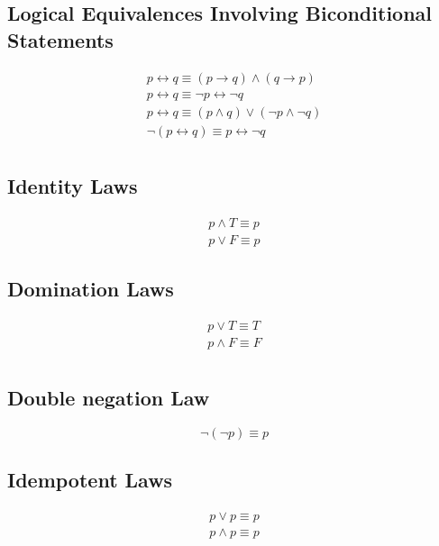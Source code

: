 \documentclass[12pt letter]{report}
\begin{document}
\subsection{Logical Equivalences Involving Biconditional Statements}

\begin{align*}
	p \leftrightarrow q \equiv \left( p\to q \right) \wedge \left( q \to   p \right)              \\
	p \leftrightarrow q \equiv \neg p \leftrightarrow \neg q                                      \\
	p \leftrightarrow q \equiv \left( p \wedge q \right) \vee \left( \neg p \wedge \neg q \right) \\
	\neg \left( p \leftrightarrow q \right) \equiv p \leftrightarrow \neg q                       \\
\end{align*}

\subsection{Identity Laws}

\begin{align*}
	p \wedge T \equiv p \\
	p \vee F  \equiv p
\end{align*}

\subsection{Domination Laws}

\begin{align*}
	p \vee T \equiv T    \\
	p \wedge  F \equiv F \\
\end{align*}

\subsection{Double negation Law}

\[
	\neg \left( \neg p \right) \equiv p
\]

\subsection{Idempotent Laws}

\begin{align*}
	p \vee p  \equiv p  \\
	p \wedge p \equiv p \\
\end{align*}
\end{document}
